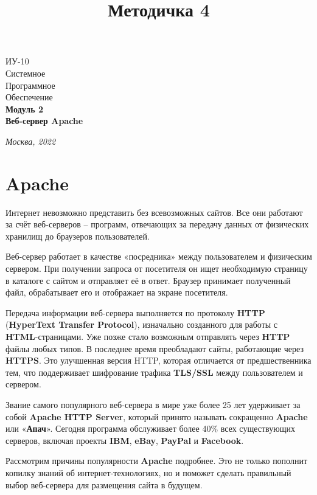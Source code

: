 \documentclass[14pt, a4paper]{article}
\title{Методичка 4}
\begin{document}
\begin{titlepage}
    \topmargin=216pt
    \newpage
    \hangindent=0.7cm
    \huge ИУ-10\\
    Системное\\
    Программное\\
    Обеспечение\\
    \textbf{Модуль 2\\ 
    Веб-сервер Apache}

    \vspace{10cm}

    \begin{center}
        \small\textit{Москва, 2022}
    \end{center}
\end{titlepage}
\tableofcontents
\newpage



\section*{Apache}
Интернет невозможно представить без всевозможных сайтов. Все они работают за счёт веб-серверов 
– программ, отвечающих за передачу данных от физических хранилищ до браузеров пользователей.

Веб-сервер работает в качестве «посредника» между пользователем и физическим сервером. 
При получении запроса от посетителя он ищет необходимую страницу в каталоге с сайтом и 
отправляет её в ответ. Браузер принимает полученный файл, обрабатывает его и отображает на экране посетителя.

Передача информации веб-сервера выполняется по протоколу \textbf{HTTP} (\textbf{HyperText Transfer Protocol}), 
изначально созданного для работы с \textbf{HTML}-страницами. Уже позже стало возможным отправлять через 
\textbf{HTTP} файлы любых типов. В последнее время преобладают сайты, работающие через \textbf{HTTPS}. Это улучшенная 
версия HTTP, которая отличается от предшественника тем, что поддерживает шифрование трафика \textbf{TLS/SSL} 
между пользователем и сервером.

Звание самого популярного веб-сервера в мире уже более 25 лет удерживает за собой \textbf{Apache HTTP Server}, 
который принято называть сокращенно \textbf{Apache} или «\textbf{Апач}». Сегодня программа обслуживает более 40\% всех 
существующих серверов, включая проекты \textbf{IBM}, \textbf{eBay}, \textbf{PayPal} и \textbf{Facebook}.

Рассмотрим причины популярности \textbf{Apache} подробнее. Это не только пополнит копилку знаний об 
интернет-технологиях, но и поможет сделать правильный выбор веб-сервера для размещения сайта в будущем.
\end{document}
